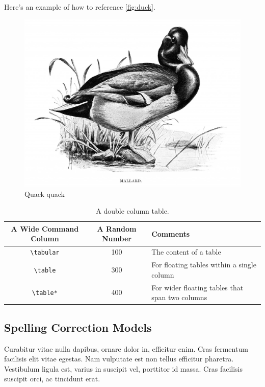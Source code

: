 \documentclass[sigconf, nonacm]{acmart}
\begin{document}
Here's an example of how to reference \autoref{fig:duck}.

\begin{figure}
  \centering
  \includegraphics[width=\linewidth]{figures/duck}
  \caption{Quack quack}
  \label{fig:duck}
\end{figure}

\begin{table}[t]
  \caption{A double column table.}
  \label{tab:commands}
  \begin{tabular}{ccl}
    \toprule
    A Wide Command Column & A Random Number & Comments\\
    \midrule
    \verb|\tabular| & 100& The content of a table \\
    \verb|\table|  & 300 & For floating tables within a single column\\
    \verb|\table*| & 400 & For wider floating tables that span two columns\\
    \bottomrule
  \end{tabular}
\end{table}

\subsection{Spelling Correction Models}

Curabitur vitae nulla dapibus, ornare dolor in, efficitur enim. Cras fermentum facilisis elit vitae egestas. Nam vulputate est non tellus efficitur pharetra. Vestibulum ligula est, varius in suscipit vel, porttitor id massa. Cras facilisis suscipit orci, ac tincidunt erat.
\end{document}
